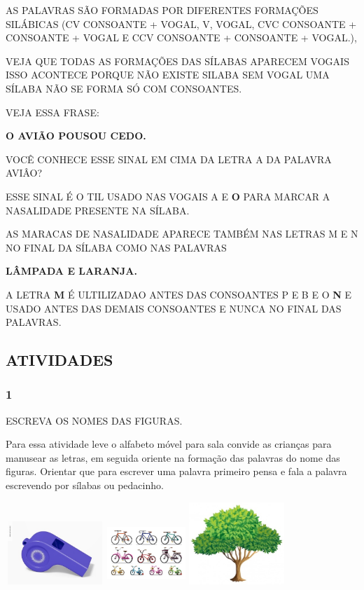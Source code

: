AS PALAVRAS SÃO FORMADAS POR DIFERENTES FORMAÇÕES SILÁBICAS (CV
CONSOANTE + VOGAL, V, VOGAL, CVC CONSOANTE + CONSOANTE + VOGAL E CCV
CONSOANTE + CONSOANTE + VOGAL.),

VEJA QUE TODAS AS FORMAÇÕES DAS SÍLABAS APARECEM VOGAIS ISSO ACONTECE
PORQUE NÃO EXISTE SILABA SEM VOGAL UMA SÍLABA NÃO SE FORMA SÓ COM
CONSOANTES.

VEJA ESSA FRASE:

\textbf{O AVIÃO POUSOU CEDO.}

VOCÊ CONHECE ESSE SINAL EM CIMA DA LETRA A DA PALAVRA AVIÂO?

ESSE SINAL É O TIL USADO NAS VOGAIS A E \textbf{O} PARA MARCAR A
NASALIDADE PRESENTE NA SÍLABA.

AS MARACAS DE NASALIDADE APARECE TAMBÉM NAS LETRAS M E N NO FINAL DA
SÍLABA COMO NAS PALAVRAS

\textbf{LÂMPADA E LARANJA.}

A LETRA \textbf{M} É ULTILIZADAO ANTES DAS CONSOANTES P E B E O
\textbf{N} E USADO ANTES DAS DEMAIS CONSOANTES E NUNCA NO FINAL DAS
PALAVRAS.

\subsection{ATIVIDADES}\label{atividades-1}

\subsubsection{1 }\label{section-15}

ESCREVA OS NOMES DAS FIGURAS.

Para essa atividade leve o alfabeto móvel para sala convide as crianças
para manusear as letras, em seguida oriente na formação das palavras do
nome das figuras. Orientar que para escrever uma palavra primeiro pensa
e fala a palavra escrevendo por sílabas ou pedacinho.

\includegraphics[width=1.46154in,height=0.93603in]{media/image49.jpeg}
\includegraphics[width=1.16587in,height=0.93269in]{media/image50.jpeg}
\includegraphics[width=1.42308in,height=1.21950in]{media/image51.jpeg}

